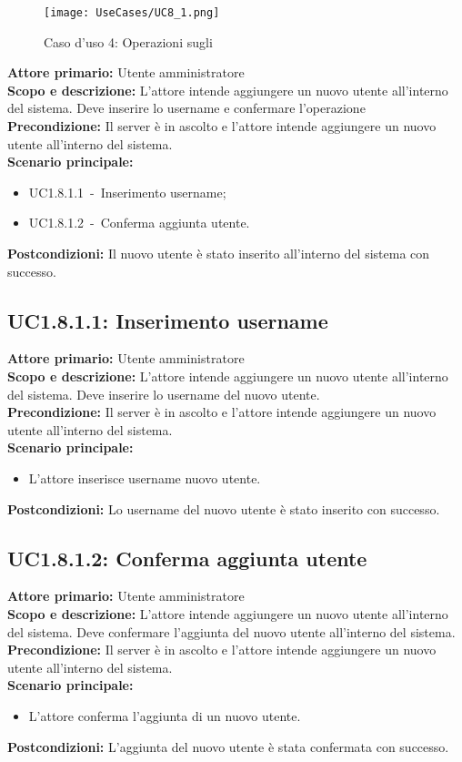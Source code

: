 \documentclass{scalatekids-article}
\begin{document}
\begin{figure}[H]
  \begin{center}
    \texttt{[image: UseCases/UC8\_1.png]}
    \caption*{Caso d'uso 4: Operazioni sugli }
  \end{center}
\end{figure}
\textbf{Attore primario:} Utente amministratore\\
\textbf{Scopo e descrizione:} L'attore intende aggiungere un nuovo utente all'interno del sistema. Deve inserire lo username e confermare l'operazione\\
\textbf{Precondizione:} Il server è in ascolto e l'attore intende aggiungere un nuovo utente all'interno del sistema.\\
\textbf{Scenario principale:}
\begin{itemize}
\item UC1.8.1.1\ -\ Inserimento username;
\item UC1.8.1.2\ -\ Conferma aggiunta utente.
\end{itemize}
\textbf{Postcondizioni:} Il nuovo utente è stato inserito all'interno del sistema con successo.

\subsection{UC1.8.1.1: Inserimento username}

\textbf{Attore primario:} Utente amministratore\\
\textbf{Scopo e descrizione:} L'attore intende aggiungere un nuovo utente all'interno del sistema. Deve inserire lo username del nuovo utente.\\
\textbf{Precondizione:} Il server è in ascolto e l'attore intende aggiungere un nuovo utente all'interno del sistema.\\
\textbf{Scenario principale:}
\begin{itemize}
\item L'attore inserisce username nuovo utente.
\end{itemize}
\textbf{Postcondizioni:} Lo username del nuovo utente è stato inserito con successo.

\subsection{UC1.8.1.2: Conferma aggiunta utente}

\textbf{Attore primario:} Utente amministratore\\
\textbf{Scopo e descrizione:} L'attore intende aggiungere un nuovo utente all'interno del sistema. Deve confermare l'aggiunta del nuovo utente all'interno del sistema.\\
\textbf{Precondizione:} Il server è in ascolto e l'attore intende aggiungere un nuovo utente all'interno del sistema.\\
\textbf{Scenario principale:}
\begin{itemize}
\item L'attore conferma l'aggiunta di un nuovo utente.
\end{itemize}
\textbf{Postcondizioni:} L'aggiunta del nuovo utente è stata confermata con successo.
\end{document}
